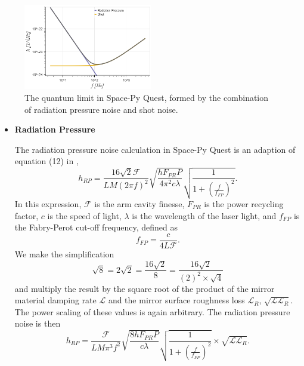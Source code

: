 \documentclass{article}
\begin{document}
\begin{itemize}
    \begin{figure}[h!]
    \centering
    \includegraphics[width=0.5\textwidth]{SPQ_aLIGO_quantum.png}
    \caption{The quantum limit in Space-Py Quest, formed by the combination of radiation pressure noise and shot noise.}
    \label{fig:quantum}
    \end{figure}
    \begin{itemize}
        \item \textbf{Radiation Pressure} \par
    The radiation pressure noise calculation in Space-Py Quest is an adaption of equation (12) in \cite{VIRGO}, 
    \[
    h_{RP} = \frac{16\sqrt{2}\mathcal{F}}{LM(2\pi f)^2}\sqrt{\frac{hF_{PR}P}{4\pi^2c\lambda}}\sqrt{\frac{1}{1 + \left(\frac{f}{f_{FP}}\right)^2}}.
    \]
    In this expression, $\mathcal{F}$ is the arm cavity finesse, $F_{PR}$ is the power recycling factor, $c$ is the speed of light, $\lambda$ is the wavelength of the laser light, and $f_{FP}$ is the Fabry-Perot cut-off frequency, defined as
    \begin{equation}
        f_{FP} = \frac{c}{4L\mathcal{F}}.
    \end{equation}
    We make the simplification
    \[
    \sqrt{8} = 2\sqrt{2} = \frac{16 \sqrt{2}}{8} = \frac{16 \sqrt{2}}{(2)^2 \times \sqrt{4}}
    \]
   and multiply the result by the square root of the product of the mirror material damping rate $\mathcal{L}$ and the mirror surface roughness loss $\mathcal{L}_R$, $\sqrt{\mathcal{L}\mathcal{L}_R}$. The power scaling of these values is again arbitrary. The radiation pressure noise is then
    \begin{equation}
    \label{eqn::radiation}
    h_{RP} = \frac{\mathcal{F}}{LM\pi^3f^2}\sqrt{\frac{8hF_{PR}P}{c\lambda}}\sqrt{\frac{1}{1 + \left(\frac{f}{f_{FP}}\right)^2}} \times \sqrt{\mathcal{L}\mathcal{L}_R}.
    \end{equation}
  

\end{itemize}
\end{itemize}
\end{document}
